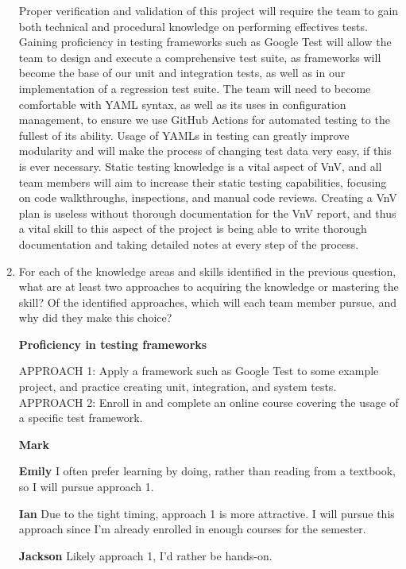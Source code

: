 \documentclass[12pt, titlepage]{article}
\begin{document}
\begin{enumerate}[leftmargin=*]
  \vspace{5pt}
  Proper verification and validation of this project will require the team to gain both technical 
  and procedural knowledge on performing effectives tests. Gaining proficiency in testing frameworks 
  such as Google Test will allow the team to design and execute a comprehensive test suite, as 
  frameworks will become the base of our unit and integration tests, as well as in our implementation 
  of a regression test suite. The team will need to become comfortable with YAML syntax, as well as 
  its uses in configuration management, to ensure we use GitHub Actions for automated testing to the 
  fullest of its ability. Usage of YAMLs in testing can greatly improve modularity and will make the 
  process of changing test data very easy, if this is ever necessary. Static testing knowledge is a 
  vital aspect of VnV, and all team members will aim to increase their static testing capabilities, 
  focusing on code walkthroughs, inspections, and manual code reviews. Creating a VnV plan is useless 
  without thorough documentation for the VnV report, and thus a vital skill to this aspect of the project 
  is being able to write thorough documentation and taking detailed notes at every step of the process.

  \item For each of the knowledge areas and skills identified in the previous
  question, what are at least two approaches to acquiring the knowledge or
  mastering the skill?  Of the identified approaches, which will each team
  member pursue, and why did they make this choice? 

  \vspace{5pt}
  \textbf{Proficiency in testing frameworks}

  APPROACH 1: Apply a framework such as Google Test to some example project, and practice creating unit, integration, and system tests. \\
  APPROACH 2: Enroll in and complete an online course covering the usage of a specific test framework.
  
  \textbf{Mark}

  \textbf{Emily} I often prefer learning by doing, rather than reading from a textbook, so I will pursue approach 1.

  \textbf{Ian} Due to the tight timing, approach 1 is more attractive. I will pursue this approach since I’m already enrolled in enough courses for the semester.

  \textbf{Jackson} Likely approach 1, I’d rather be hands-on.


\end{enumerate}
\end{document}
